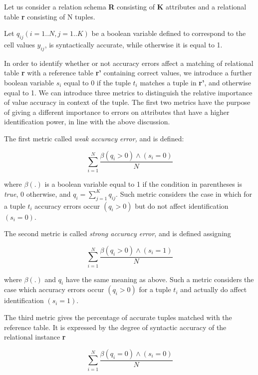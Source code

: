 Let us consider a relation schema \textbf{R} consisting of \textbf{K}
attributes and a relational table \textbf{r} consisting of N tuples. 

Let $q_{ij}(i=1..N, j=1..K)$ be a boolean variable defined to correspond to the cell values 
$y_{ij}$, is syntactically accurate, while otherwise it is equal to 1. 

In order to identify whether or not accuracy errors affect a matching of 
relational table \textbf{r} with a reference table \textbf{r'} containing correct
values, we introduce a further boolean variable $s_i$ equal to 0 if the tuple $t_i$ 
matches a tuple in \textbf{r'}, and otherwise equal to 1. We can introduce three metrics to distinguish
the relative importance of value accuracy in context of the tuple.
The first two metrics have the purpose of giving a different importance to 
errors on attributes that have a higher identification power, in line with 
the above discussion.

The first metric called \textit{weak accuracy error,} and is defined:

\begin{equation*}
    \sum_{i = 1}^{N} \frac{\beta(q_i > 0)\wedge(s_i=0)}{N}
\end{equation*}

where $\beta(.)$ is a boolean variable equal to 1 if the condition in parentheses is 
\textit{true}, 0 otherwise, and $q_i =\sum\nolimits_{j=1}^K q_{ij}$. Such metric considers the case in 
which for a tuple $t_i$ accuracy errors occur $(q_i > 0)$ but do not affect identification
$(s_i = 0)$.

The second metric is called \textit{strong accuracy error}, and is defined assigning

\begin{equation*}
    \sum_{i = 1}^{N} \frac{\beta(q_i > 0)\wedge(s_i=1)}{N}
\end{equation*}

where $\beta(.)$ and $q_i$ have the same meaning as above. Such a metric considers
the case which accuracy errors occur $(q_i > 0)$ for a tuple $t_i$ and actually 
do affect identification $(s_i = 1)$.

The third metric gives the percentage of accurate tuples matched with
the reference table. It is expressed by the degree of syntactic accuracy of the
relational instance \textbf{r}

\begin{equation*}
    \sum_{i = 1}^{N} \frac{\beta(q_i =0)\wedge(s_i=0)}{N}
\end{equation*}

